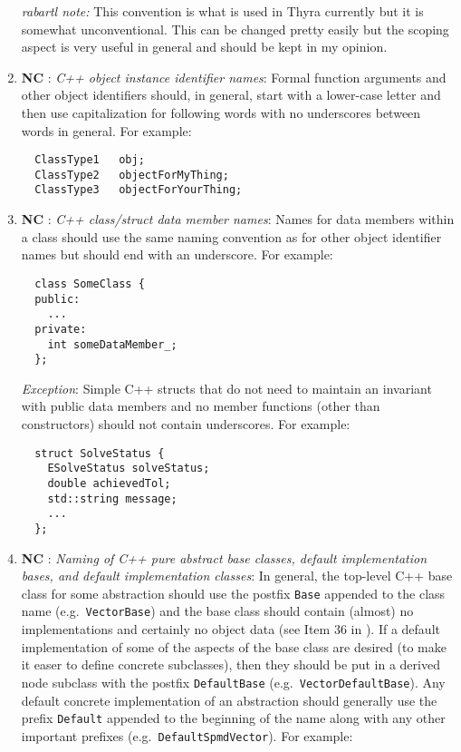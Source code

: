 \begin{enumerate}
{}\textit{rabartl note:} This convention is what is used in Thyra currently
but it is somewhat unconventional.  This can be changed pretty easily but the
scoping aspect is very useful in general and should be kept in my opinion.

{}\item{}\textbf{NC }:
{}\textit{C++ object instance identifier names}: Formal function
arguments and other object identifiers should, in general, start with a
lower-case letter and then use capitalization for following words with no
underscores between words in general.  For example:

{\small\begin{verbatim}
  ClassType1   obj;
  ClassType2   objectForMyThing;
  ClassType3   objectForYourThing;
\end{verbatim}}

{}\item{}\textbf{NC }:
{}\textit{C++ class/struct data member names}: Names for data members
within a class should use the same naming convention as for other object
identifier names but should end with an underscore.  For example:

{\small\begin{verbatim}
  class SomeClass {
  public:
    ...
  private:
    int someDataMember_;
  };
\end{verbatim}}

{}\textit{Exception}: Simple C++ structs that do not need to maintain an
invariant with public data members and no member functions (other than
constructors) should not contain underscores.  For example:

{\small\begin{verbatim}
  struct SolveStatus {
    ESolveStatus solveStatus;
    double achievedTol;
    std::string message;
    ...
  };
\end{verbatim}}

{}\item{}\textbf{NC }:
{}\textit{Naming of C++ pure abstract base classes, default
implementation bases, and default implementation classes}: In general, the
top-level C++ base class for some abstraction should use the postfix
{}\texttt{Base} appended to the class name (e.g.\ {}\texttt{Vector\-Base}) and
the base class should contain (almost) no implementations and certainly no
object data (see Item 36 in {}\cite{C++CodingStandards05}).  If a default
implementation of some of the aspects of the base class are desired (to make
it easer to define concrete subclasses), then they should be put in a derived
node subclass with the postfix {}\texttt{DefaultBase} (e.g.\
{}\texttt{Vector\-Default\-Base}).  Any default concrete implementation of an
abstraction should generally use the prefix {}\texttt{Default} appended to the
beginning of the name along with any other important prefixes (e.g.\
{}\texttt{DefaultSpmdVector}).  For example:


\end{enumerate}

